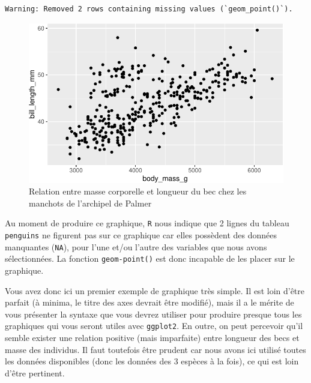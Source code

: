 \documentclass[
  a4paper,
  DIV=11,
  numbers=noendperiod,
  oneside]{scrreprt}
\begin{document}
\begin{verbatim}
Warning: Removed 2 rows containing missing values (`geom_point()`).
\end{verbatim}

\begin{figure}[H]

{\centering \includegraphics{03-visualization_files/figure-pdf/unnamed-chunk-6-1.pdf}

}

\caption{Relation entre masse corporelle et longueur du bec chez les
manchots de l'archipel de Palmer}

\end{figure}%

Au moment de produire ce graphique, \texttt{R} nous indique que 2 lignes
du tableau \texttt{penguins} ne figurent pas sur ce graphique car elles
possèdent des données manquantes (\texttt{NA}), pour l'une et/ou l'autre
des variables que nous avons sélectionnées. La fonction
\texttt{geom-point()} est donc incapable de les placer sur le graphique.

Vous avez donc ici un premier exemple de graphique très simple. Il est
loin d'être parfait (à minima, le titre des axes devrait être modifié),
mais il a le mérite de vous présenter la syntaxe que vous devrez
utiliser pour produire presque tous les graphiques qui vous seront
utiles avec \texttt{ggplot2}. En outre, on peut percevoir qu'il semble
exister une relation positive (mais imparfaite) entre longueur des becs
et masse des individus. Il faut toutefois être prudent car nous avons
ici utilisé toutes les données disponibles (donc les données des 3
espèces à la fois), ce qui est loin d'être pertinent.
\end{document}
